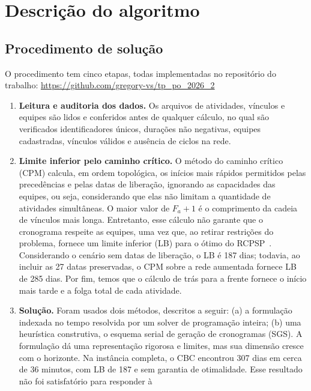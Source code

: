 
\section{Descrição do algoritmo}
\label{sec:algoritmo}

\subsection{Procedimento de solução}
\label{sec:procedimento}

O procedimento tem cinco etapas, todas implementadas no repositório do
trabalho: \url{https://github.com/gregory-vs/tp_po_2026_2}

\begin{enumerate}
  \item \textbf{Leitura e auditoria dos dados.} Os arquivos de atividades,
    vínculos e equipes são lidos e conferidos antes de qualquer cálculo, no qual são verificados
    identificadores únicos, durações não negativas, equipes cadastradas,
    vínculos válidos e ausência de ciclos na rede.
  \item \textbf{Limite inferior pelo caminho crítico.} O método do caminho
    crítico (CPM) calcula, em ordem topológica, os inícios mais rápidos
    permitidos pelas precedências e pelas datas de liberação, ignorando as
    capacidades das equipes, ou seja, considerando que elas não limitam a quantidade de
    atividades simultâneas. O maior valor de $F_a+1$ é o comprimento da
    cadeia de vínculos mais longa. Entretanto, esse cálculo não garante que o
    cronograma respeite as equipes, uma vez que, ao retirar restrições do problema,
    fornece um limite inferior (LB) para o ótimo do RCPSP~\cite{kelley1961}. Considerando o cenário sem datas de liberação, o LB é 187 dias; todavia, ao incluir as 27 datas preservadas, o CPM sobre a rede aumentada fornece LB de 285 dias. Por fim, temos que o
    cálculo de trás para a frente fornece o início mais tarde e a folga
    total de cada atividade.
  \item \textbf{Solução.} Foram usados dois métodos, descritos a seguir:
    (a) a formulação indexada no tempo resolvida por um solver de
    programação inteira; (b) uma heurística construtiva, o esquema serial
    de geração de cronogramas (SGS). A formulação dá uma representação
    rigorosa e limites, mas sua dimensão cresce com o horizonte. Na
    instância completa, o CBC encontrou 307 dias em cerca de 36 minutos,
    com LB de 187 e sem garantia de otimalidade. Esse resultado não foi satisfatório para responder à

\end{enumerate}
